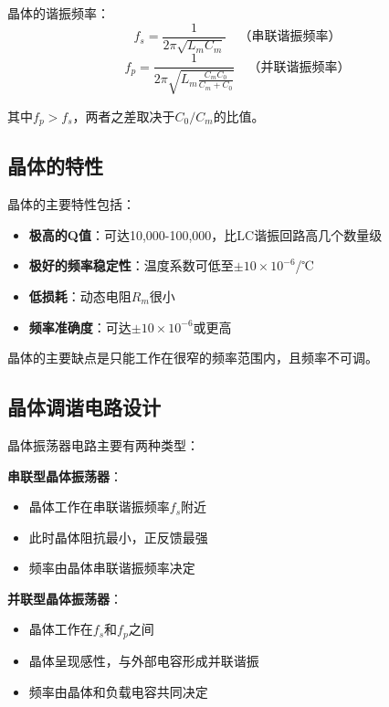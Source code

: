 晶体的谐振频率：
\begin{equation}
f_s = \frac{1}{2\pi\sqrt{L_m C_m}} \quad \text{（串联谐振频率）}
\end{equation}
\begin{equation}
f_p = \frac{1}{2\pi\sqrt{L_m \frac{C_m C_0}{C_m + C_0}}} \quad \text{（并联谐振频率）}
\end{equation}

其中$f_p > f_s$，两者之差取决于$C_0/C_m$的比值。

\subsection{晶体的特性}
\label{sec:crystal_characteristics}

晶体的主要特性包括：

\begin{itemize}
    \item \textbf{极高的Q值}：可达10,000-100,000，比LC谐振回路高几个数量级
    \item \textbf{极好的频率稳定性}：温度系数可低至$\pm10\times10^{-6}$/℃
    \item \textbf{低损耗}：动态电阻$R_m$很小
    \item \textbf{频率准确度}：可达$\pm10\times10^{-6}$或更高
\end{itemize}

晶体的主要缺点是只能工作在很窄的频率范围内，且频率不可调。

\subsection{晶体调谐电路设计}
\label{sec:crystal_circuit_design}

晶体振荡器电路主要有两种类型：

\textbf{串联型晶体振荡器}：
\begin{itemize}
    \item 晶体工作在串联谐振频率$f_s$附近
    \item 此时晶体阻抗最小，正反馈最强
    \item 频率由晶体串联谐振频率决定
\end{itemize}

\textbf{并联型晶体振荡器}：
\begin{itemize}
    \item 晶体工作在$f_s$和$f_p$之间
    \item 晶体呈现感性，与外部电容形成并联谐振
    \item 频率由晶体和负载电容共同决定
\end{itemize}

